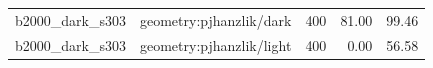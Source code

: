 \begin{longtable}{l>{\raggedright\arraybackslash}p{.42\linewidth}rrr}
b2000\_\allowbreak{}dark\_\allowbreak{}s303 & %
geometry:pjhanzlik/dark & %
400 & %
81.00 & %
99.46 \\ %

b2000\_\allowbreak{}dark\_\allowbreak{}s303 & %
geometry:pjhanzlik/light & %
400 & %
0.00 & %
56.58 \\ %


\end{longtable}
